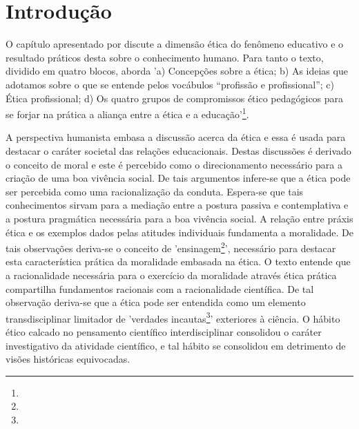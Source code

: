 \documentclass[
   article,       %
   12pt,          %
   oneside,       %
   a4paper,       %
   english,       %
   brazil,           %
   sumario=tradicional
   ]{abntex2}
\begin{document}

\frenchspacing 


\maketitle


\newpage

\textual
\section{Introdução}


O capítulo apresentado por  discute a dimensão ética do fenômeno educativo e o resultado práticos desta sobre o conhecimento humano. Para tanto o texto, dividido em quatro blocos, aborda 'a) Concepções sobre a ética; b) As ideias que adotamos sobre o que se entende pelos vocábulos “profissão e profissional”; c) Ética profissional; d) Os quatro grupos de compromissos ético pedagógicos para se forjar na prática a aliança entre a ética e a educação'\footnote{}.

A perspectiva humanista embasa a discussão acerca da ética e essa é usada para destacar o caráter societal das relações educacionais. Destas discussões é derivado o conceito de moral e este é percebido como o direcionamento necessário para a criação de uma boa vivência social. De tais argumentos infere-se que a ética pode ser percebida como uma racionalização da conduta. Espera-se que tais conhecimentos sirvam para a mediação entre a postura passiva e contemplativa e a postura pragmática necessária para a boa vivência social. A relação entre práxis ética e os exemplos dados pelas atitudes individuais fundamenta a moralidade. De tais observações deriva-se o conceito de 'ensinagem\footnote{}', necessário para destacar esta característica prática da moralidade embasada na ética. O texto entende que a racionalidade necessária para o exercício da moralidade através ética prática compartilha fundamentos racionais com a racionalidade científica. De tal observação deriva-se que a ética pode ser entendida como um elemento transdisciplinar limitador de 'verdades incautas\footnote{}' exteriores à ciência. O hábito ético calcado no pensamento científico interdisciplinar consolidou o caráter investigativo da atividade científico, e tal hábito se consolidou em detrimento de visões históricas equivocadas.
\end{document}
